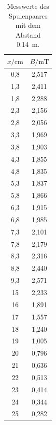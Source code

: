 \begin{table}[H]
  \centering
  \caption{Messwerte des Spulenpaares mit dem Abstand \SI{0.14}{\meter}.}
  \label{tab:5}
  \begin{tabular}{c c}
    \toprule
    $x/\si{\centi\meter}$ & $B/\si{\milli\tesla}$ \\
    \midrule
    0,8 & 2,517 \\
    1,3 & 2,411 \\
    1,8 & 2,288 \\
    2,3 & 2,156 \\
    2,8 & 2,056 \\
    3,3 & 1,969 \\
    3,8 & 1,903 \\
    4,3 & 1,855 \\
    4,8 & 1,835 \\
    5,3 & 1,837 \\
    5,8 & 1,866 \\
    6,3 & 1,915 \\
    6,8 & 1,985 \\
    7,3 & 2,101 \\
    7,8 & 2,179 \\
    8,3 & 2,316 \\
    8,8 & 2,440 \\
    9,3 & 2,571 \\
    15  & 2,233 \\
    16  & 1,891 \\
    17  & 1,557 \\
    18  & 1,240 \\
    19  & 1,005 \\
    20  & 0,796 \\
    21  & 0,636 \\
    22  & 0,513 \\
    23  & 0,414 \\
    24  & 0,344 \\
    25  & 0,282 \\
    \bottomrule
  \end{tabular}
\end{table}

